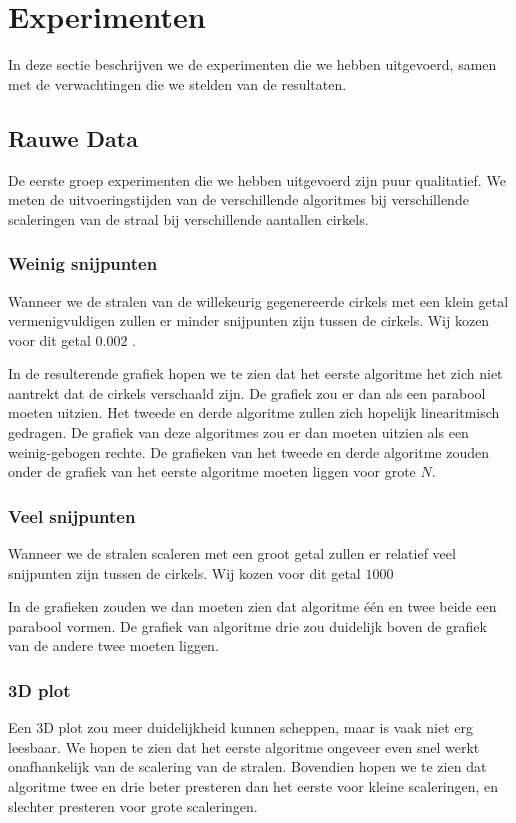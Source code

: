 \section{Experimenten}
In deze sectie beschrijven we de experimenten die we hebben uitgevoerd, samen met de verwachtingen die we stelden van de resultaten.

\subsection{Rauwe Data}
De eerste groep experimenten die we hebben uitgevoerd zijn puur qualitatief. We meten de uitvoeringstijden van de verschillende algoritmes bij verschillende scaleringen van de straal bij verschillende aantallen cirkels.

\subsubsection{Weinig snijpunten}
Wanneer we de stralen van de willekeurig gegenereerde cirkels met een klein getal vermenigvuldigen zullen er minder snijpunten zijn tussen de cirkels. Wij kozen voor dit getal $0.002$ .

In de resulterende grafiek hopen we te zien dat het eerste algoritme het zich niet aantrekt dat de cirkels verschaald zijn. De grafiek zou er dan als een parabool moeten uitzien. Het tweede en derde algoritme zullen zich hopelijk linearitmisch gedragen. De grafiek van deze algoritmes zou er dan moeten uitzien als een weinig-gebogen rechte. De grafieken van het tweede en derde algoritme zouden onder de grafiek van het eerste algoritme moeten liggen voor grote $N$.

\subsubsection{Veel snijpunten}
Wanneer we de stralen scaleren met een groot getal zullen er relatief veel snijpunten zijn tussen de cirkels. Wij kozen voor dit getal $1000$ 

In de grafieken zouden we dan moeten zien dat algoritme \'e\'en en twee beide een parabool vormen. De grafiek van algoritme drie zou duidelijk boven de grafiek van de andere twee moeten liggen.

\subsubsection{3D plot}
Een 3D plot zou meer duidelijkheid kunnen scheppen, maar is vaak niet erg leesbaar. We hopen te zien dat het eerste algoritme ongeveer even snel werkt onafhankelijk van de scalering van de stralen. Bovendien hopen we te zien dat algoritme twee en drie beter presteren dan het eerste voor kleine scaleringen, en slechter presteren voor grote scaleringen.


